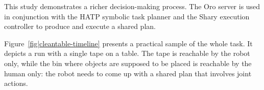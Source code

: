 \documentclass[preprint,3p,times]{elsarticle}
\newcommand{\action}[3]{#1\\\textsf{\scriptsize #2,}\\\textsf{\scriptsize #3}}
\begin{document}
This study demonstrates a richer decision-making process. The {\sc Oro} server
is used in conjunction with the HATP symbolic task planner and the {\sc Shary}
execution controller to produce and execute a shared plan.


%
%
%
%
%
%
%
%
%
%
%
Figure~\ref{fig|cleantable-timeline} presents a practical sample of the whole
task. It depicts a run with a single tape on a table. The tape is
reachable by the robot only, while the bin where objects are supposed to be
placed is reachable by the human only: the robot needs to come up with a shared
plan that involves joint actions.
\end{document}
